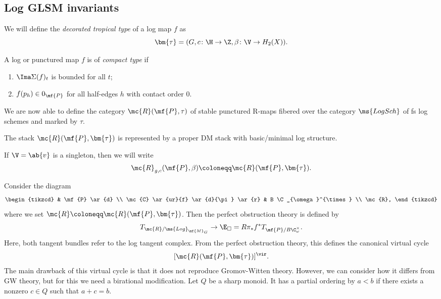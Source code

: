 \subsection{Log GLSM invariants}%
\label{sub:Log GLSM invariants}

\begin{defn}
    We will define the \textit{decorated tropical type} of a log map \(f\) as
    \[ \bm{\tau} = (G, c \colon \H \to \Z, \beta \colon \V \to H_2(X)). \]
\end{defn}

\begin{defn}
    A log or punctured map \(f\) is of \textit{compact type} if
    \begin{enumerate}
        \item \(\Ima \Sigma(f)_t\) is bounded for all \(t\);
        \item \(f(p_h) \in 0_{\mf{P}}\) for all half-edges \(h\) with contact order \(0\).
    \end{enumerate}
\end{defn}

We are now able to define the category \(\mc{R}(\mf{P}, \tau)\) of stable punctured R-maps fibered over the category \(\ms{LogSch}\) of fs log schemes and marked by \(\tau\).

\begin{thm}
    The stack \(\mc{R}(\mf{P},\bm{\tau})\) is represented by a proper DM stack with basic/minimal log structure.
\end{thm}

\begin{rmk}
    If \(\V = \ab\{v\}\) is a singleton, then we will write
    \[ \mc{R}_{g, c}(\mf{P}, \beta) \coloneqq \mc{R}(\mf{P}, \bm{\tau}). \]
\end{rmk}

Consider the diagram
\begin{equation*}
\begin{tikzcd}
    & \mf{P} \ar{d} \\
    \mc{C} \ar{ur}{f} \ar{d}{\pi} \ar{r} & B \C_{\omega}^{\times} \\
    \mc{R},
\end{tikzcd}
\end{equation*}
where we set \(\mc{R} \coloneqq \mc{R}(\mf{P}, \bm{\tau})\). Then the perfect obstruction theory is defined by
\[ T_{\mc{R}/\ms{Log}_{\mf{M}_G}} \to \E_{\square} = R \pi_* f^* T_{\mf{P}/B\C_{\omega}^{\times}}. \]
Here, both tangent bundles refer to the log tangent complex. From the perfect obstruction theory, this defines the canonical virtual cycle
\[ [\mc{R}(\mf{P}, \bm{\tau})]^{\vir}. \]
The main drawback of this virtual cycle is that it does not reproduce Gromov-Witten theory. However, we can consider how it differs from GW theory, but for this we need a birational modification. Let \(Q\) be a sharp monoid. It has a partial ordering by \(a < b\) if there exists a nonzero \(c \in Q\) such that \(a+c = b\).

